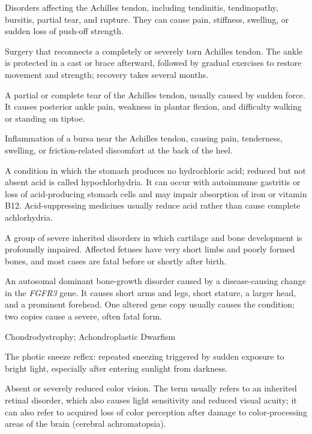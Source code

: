  Disorders affecting the Achilles tendon, including tendinitis, tendinopathy, bursitis, partial tear, and rupture. They can cause pain, stiffness, swelling, or sudden loss of push-off strength.

 Surgery that reconnects a completely or severely torn Achilles tendon. The ankle is protected in a cast or brace afterward, followed by gradual exercises to restore movement and strength; recovery takes several months.

 A partial or complete tear of the Achilles tendon, usually caused by sudden force. It causes posterior ankle
pain, weakness in plantar flexion, and difficulty walking or standing on tiptoe.

 Inflammation of a bursa near the Achilles tendon, causing pain, tenderness, swelling, or friction-related discomfort at the back of the heel.

 A condition in which the stomach produces no hydrochloric acid; reduced but not absent acid is called hypochlorhydria. It can occur with autoimmune gastritis or loss of acid-producing stomach cells and may impair absorption of iron or vitamin B12. Acid-suppressing medicines usually reduce acid rather than cause complete achlorhydria.

 A group of severe inherited disorders in which cartilage and bone development is profoundly impaired. Affected fetuses have very short limbs and poorly formed bones, and most cases are fatal before or shortly after birth.

 An autosomal dominant bone-growth disorder caused by a disease-causing change in the \textit{FGFR3} gene. It causes short arms and legs, short stature, a larger head, and a prominent forehead. One altered gene copy usually causes the condition; two copies cause a severe, often fatal form.

\synonyms
Chondrodystrophy; Achondroplastic Dwarfism

 The photic sneeze reflex: repeated sneezing triggered by sudden exposure to bright light, especially after entering sunlight from darkness.

 Absent or severely reduced color vision. The term usually refers to an inherited retinal disorder, which also causes light sensitivity and reduced visual acuity; it can also refer to acquired loss of color perception after damage to color-processing areas of the brain (cerebral achromatopsia).

